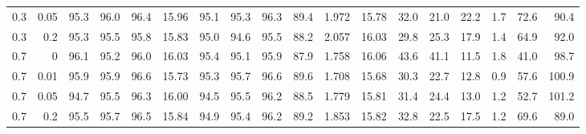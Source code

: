 \begin{table}[t]
{\begin{tabular}{rr rrrr rrrrrr rrrrrr}
0.3 & 0.05 & 95.3 & 96.0 & 96.4 & 15.96 & 95.1 & 95.3 & 96.3 & 89.4 & 1.972 & 15.78 & 32.0 & 21.0 & 22.2 & 1.7 & 72.6 & 90.4 \\
0.3 & 0.2 & 95.3 & 95.5 & 95.8 & 15.83 & 95.0 & 94.6 & 95.5 & 88.2 & 2.057 & 16.03 & 29.8 & 25.3 & 17.9 & 1.4 & 64.9 & 92.0 \\
0.7 & 0 & 96.1 & 95.2 & 96.0 & 16.03 & 95.4 & 95.1 & 95.9 & 87.9 & 1.758 & 16.06 & 43.6 & 41.1 & 11.5 & 1.8 & 41.0 & 98.7 \\
0.7 & 0.01 & 95.9 & 95.9 & 96.6 & 15.73 & 95.3 & 95.7 & 96.6 & 89.6 & 1.708 & 15.68 & 30.3 & 22.7 & 12.8 & 0.9 & 57.6 & 100.9 \\
0.7 & 0.05 & 94.7 & 95.5 & 96.3 & 16.00 & 94.5 & 95.5 & 96.2 & 88.5 & 1.779 & 15.81 & 31.4 & 24.4 & 13.0 & 1.2 & 52.7 & 101.2 \\
0.7 & 0.2 & 95.5 & 95.7 & 96.5 & 15.84 & 94.9 & 95.4 & 96.2 & 89.2 & 1.853 & 15.82 & 32.8 & 22.5 & 17.5 & 1.2 & 69.6 & 89.0 \\
\bottomrule
\end{tabular}}
\end{table}